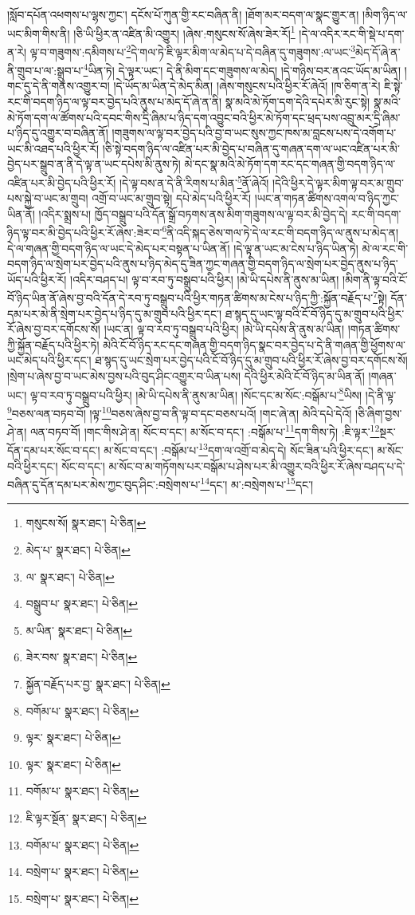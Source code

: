 །སློབ་དཔོན་འཕགས་པ་ལྷས་ཀྱང་། དངོས་པོ་ཀུན་གྱི་རང་བཞིན་ནི། །ཐོག་མར་བདག་ལ་སྣང་གྱུར་ན། །མིག་ཉིད་ལ་ཡང་མིག་གིས་ནི། །ཅི་ཡི་ཕྱིར་ན་འཛིན་མི་འགྱུར། །ཞེས་:གསུངས་སོ་ཞེས་ཟེར་རོ།\footnote{གསུངས་སོ།  སྣར་ཐང་།  པེ་ཅིན། } །དེ་ལ་འདིར་རང་གི་སྡེ་པ་དག་ན་རེ། ལྟ་བ་གཟུགས་:དམིགས་པ་\footnote{མེད་པ་  སྣར་ཐང་།  པེ་ཅིན། }དེ་གལ་ཏེ་ཇི་ལྟར་མིག་ལ་མེད་པ་དེ་བཞིན་དུ་གཟུགས་:ལ་ཡང་\footnote{ལ་  སྣར་ཐང་།  པེ་ཅིན། }མེད་དོ་ཞེ་ན་ནི་གྲུབ་པ་ལ་:སྒྲུབ་པ་\footnote{བསྒྲུབ་པ་  སྣར་ཐང་།  པེ་ཅིན། }ཡིན་ཏེ། དེ་ལྟར་ཡང་། དེ་ནི་མིག་དང་གཟུགས་ལ་མེད། །དེ་གཉིས་བར་ནའང་ཡོད་མ་ཡིན། །གང་དུ་དེ་ནི་གནས་འགྱུར་བ། །དེ་ཡོད་མ་ཡིན་དེ་མེད་མིན། །ཞེས་གསུངས་པའི་ཕྱིར་རོ་ཞེའོ། །ཁ་ཅིག་ན་རེ། ཇི་སྟེ་རང་གི་བདག་ཉིད་ལ་ལྟ་བར་བྱེད་པའི་ནུས་པ་མེད་དོ་ཞེ་ན་ནི། སྣ་མའི་མེ་ཏོག་དག་དེའི་དཔེར་མི་རུང་སྟེ། སྣ་མའི་མེ་ཏོག་དག་ལ་ཚོགས་པའི་དབང་གིས་དྲི་ཞིམ་པ་ཉིད་དག་འབྱུང་བའི་ཕྱིར་མེ་ཏོག་དང་ཕྲད་པས་འབྲུ་མར་དྲི་ཞིམ་པ་ཉིད་དུ་འགྱུར་བ་བཞིན་ནོ། །གཟུགས་ལ་ལྟ་བར་བྱེད་པའི་བྱ་བ་ཡང་སུས་ཀྱང་ཁས་མ་བླངས་པས་དེ་འགོག་པ་ཡང་མི་འཐད་པའི་ཕྱིར་རོ། །ཅི་སྟེ་བདག་ཉིད་ལ་འཛིན་པར་མི་བྱེད་པ་བཞིན་དུ་གཞན་དག་ལ་ཡང་འཛིན་པར་མི་བྱེད་པར་སྒྲུབ་ན་ནི་དེ་ལྟ་ན་ཡང་དཔེས་མི་ནུས་ཏེ། མེ་དང་སྣ་མའི་མེ་ཏོག་དག་རང་དང་གཞན་གྱི་བདག་ཉིད་ལ་འཛིན་པར་མི་བྱེད་པའི་ཕྱིར་རོ། །དེ་ལྟ་བས་ན་དེ་ནི་རིགས་པ་མིན་\footnote{མ་ཡིན་  སྣར་ཐང་།  པེ་ཅིན། }ནོ་ཞེའོ། །དེའི་ཕྱིར་དེ་ལྟར་མིག་ལྟ་བར་མ་གྲུབ་པས་སྐྱེ་བ་ཡང་མ་གྲུབ། འགྲོ་བ་ཡང་མ་གྲུབ་སྟེ། དཔེ་མེད་པའི་ཕྱིར་རོ། །ཡང་ན་གཏན་ཚིགས་འགལ་བ་ཉིད་ཀྱང་ཡིན་ནོ། །འདིར་སྨྲས་པ། ཁྱོད་བསྒྲུབ་པའི་དོན་སྒྲོ་བཏགས་ནས་མིག་གཟུགས་ལ་ལྟ་བར་མི་བྱེད་དེ། རང་གི་བདག་ཉིད་ལྟ་བར་མི་བྱེད་པའི་ཕྱིར་རོ་ཞེས་:ཟེར་བ་\footnote{ཟེར་བས་  སྣར་ཐང་།  པེ་ཅིན། }ནི་འདི་སྐད་ཅེས་གལ་ཏེ་དེ་ལ་རང་གི་བདག་ཉིད་ལ་ནུས་པ་མེད་ན། དེ་ལ་གཞན་གྱི་བདག་ཉིད་ལ་ཡང་དེ་མེད་པར་བསྟན་པ་ཡིན་ནོ། །དེ་ལྟ་ན་ཡང་མ་ངེས་པ་ཉིད་ཡིན་ཏེ། མེ་ལ་རང་གི་བདག་ཉིད་ལ་སྲེག་པར་བྱེད་པའི་ནུས་པ་ཉིད་མེད་དུ་ཟིན་ཀྱང་གཞན་གྱི་བདག་ཉིད་ལ་སྲེག་པར་བྱེད་ནུས་པ་ཉིད་ཡོད་པའི་ཕྱིར་རོ། །འདིར་བཤད་པ། ལྟ་བ་རབ་ཏུ་བསྒྲུབ་པའི་ཕྱིར། །མེ་ཡི་དཔེས་ནི་ནུས་མ་ཡིན། །མིག་ནི་ལྟ་བའི་ངོ་བོ་ཉིད་ཡིན་ནོ་ཞེས་བྱ་བའི་དོན་དེ་རབ་ཏུ་བསྒྲུབ་པའི་ཕྱིར་གཏན་ཚིགས་མ་ངེས་པ་ཉིད་ཀྱི་:སྐྱོན་བརྗོད་པ་\footnote{སྐྱོན་བརྗོད་པར་བྱ་  སྣར་ཐང་།  པེ་ཅིན། }སྟེ། དོན་དམ་པར་མེ་ནི་སྲེག་པར་བྱེད་པ་ཉིད་དུ་མ་གྲུབ་པའི་ཕྱིར་དང་། ཐ་སྙད་དུ་ཡང་ལྟ་བའི་ངོ་བོ་ཉིད་དུ་མ་གྲུབ་པའི་ཕྱིར་རོ་ཞེས་བྱ་བར་དགོངས་སོ། །ཡང་ན། ལྟ་བ་རབ་ཏུ་བསྒྲུབ་པའི་ཕྱིར། །མེ་ཡི་དཔེས་ནི་ནུས་མ་ཡིན། །གཏན་ཚིགས་ཀྱི་སྐྱོན་བརྗོད་པའི་ཕྱིར་ཏེ། མེའི་ངོ་བོ་ཉིད་རང་དང་གཞན་གྱི་བདག་ཉིད་སྣང་བར་བྱེད་པ་དེ་ནི་གཞན་གྱི་ཕྱོགས་ལ་ཡང་མེད་པའི་ཕྱིར་དང་། ཐ་སྙད་དུ་ཡང་སྲེག་པར་བྱེད་པའི་ངོ་བོ་ཉིད་དུ་མ་གྲུབ་པའི་ཕྱིར་རོ་ཞེས་བྱ་བར་དགོངས་སོ། །སྲེག་པ་ཞེས་བྱ་བ་ཡང་མེས་བྱས་པའི་བུད་ཤིང་འགྱུར་བ་ཡིན་པས། དེའི་ཕྱིར་མེའི་ངོ་བོ་ཉིད་མ་ཡིན་ནོ། །གཞན་ཡང་། ལྟ་བ་རབ་ཏུ་བསྒྲུབ་པའི་ཕྱིར། །མེ་ཡི་དཔེས་ནི་ནུས་མ་ཡིན། །སོང་དང་མ་སོང་:བསྒོམ་པ་\footnote{བགོམ་པ་  སྣར་ཐང་།  པེ་ཅིན། }ཡིས། །དེ་ནི་ལྟ་\footnote{ལྟར་  སྣར་ཐང་།  པེ་ཅིན། }བཅས་ལན་བཏབ་བོ། །ལྟ་\footnote{ལྟར་  སྣར་ཐང་།  པེ་ཅིན། }བཅས་ཞེས་བྱ་བ་ནི་ལྟ་བ་དང་བཅས་པའོ། །གང་ཞེ་ན། མེའི་དཔེ་དེའོ། །ཅི་ཞིག་བྱས་ཤེ་ན། ལན་བཏབ་བོ། །གང་གིས་ཤེ་ན། སོང་བ་དང་། མ་སོང་བ་དང་། :བསྒོམ་པ་\footnote{བགོམ་པ་  སྣར་ཐང་།  པེ་ཅིན། }དག་གིས་ཏེ། :ཇི་ལྟར་\footnote{ཇི་ལྟར་སྔོན་  སྣར་ཐང་།  པེ་ཅིན། }སྔར་དོན་དམ་པར་སོང་བ་དང་། མ་སོང་བ་དང་། :བསྒོམ་པ་\footnote{བགོམ་པ་  སྣར་ཐང་།  པེ་ཅིན། }དག་ལ་འགྲོ་བ་མེད་དེ། སོང་ཟིན་པའི་ཕྱིར་དང་། མ་སོང་བའི་ཕྱིར་དང་། སོང་བ་དང་། མ་སོང་བ་མ་གཏོགས་པར་བསྒོམ་པ་ཤེས་པར་མི་འགྱུར་བའི་ཕྱིར་རོ་ཞེས་བཤད་པ་དེ་བཞིན་དུ་དོན་དམ་པར་མེས་ཀྱང་བུད་ཤིང་:བསྲེགས་པ་\footnote{བསྲེག་པ་  སྣར་ཐང་།  པེ་ཅིན། }དང་། མ་:བསྲེགས་པ་\footnote{བསྲེག་པ་  སྣར་ཐང་།  པེ་ཅིན། }དང་། 